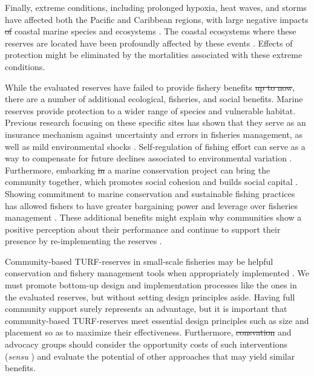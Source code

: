 \documentclass{frontiersSCNS}
\providecommand{\DIFaddtex}[1]{{\protect\color{blue}\uwave{#1}}} %
\providecommand{\DIFdeltex}[1]{{\protect\color{red}\sout{#1}}}                      %
\providecommand{\DIFaddbegin}{} %
\providecommand{\DIFaddend}{} %
\providecommand{\DIFdelbegin}{} %
\providecommand{\DIFdelend}{} %
\providecommand{\DIFadd}[1]{\texorpdfstring{\DIFaddtex{#1}}{#1}} %
\providecommand{\DIFdel}[1]{\texorpdfstring{\DIFdeltex{#1}}{}} %
\begin{document}
Finally, extreme conditions, including prolonged hypoxia, heat waves,
and storms have affected both the Pacific and Caribbean regions, with
large negative impacts \DIFdelbegin \DIFdel{of }\DIFdelend \DIFaddbegin \DIFadd{on }\DIFaddend coastal marine species and ecosystems
\citep{cavole_2016,hughes_2018,breitburg_2018}. The coastal ecosystems
where these reserves are located have been profoundly affected by these
events \citep{micheli_2012-EU,woodson_2018}. Effects of protection might
be eliminated by the mortalities associated with these extreme
conditions.

While the evaluated reserves have failed to provide fishery benefits \DIFdelbegin \DIFdel{up
to
now}\DIFdelend \DIFaddbegin \DIFadd{to
date}\DIFaddend , there are a number of additional ecological, fisheries, and social
benefits. Marine reserves provide protection to a wider range of species
and vulnerable habitat. Previous research focusing on these specific
sites has shown that they serve as an insurance mechanism against
uncertainty and errors in fisheries management, as well as mild
environmental shocks
\citep{micheli_2012-EU,deleo_2015,roberts_2017-J9,aalto}.
Self-regulation of fishing effort can serve as a way to compensate for
future declines associated to environmental variation
\citep{finkbeiner_2018}. Furthermore, embarking \DIFdelbegin \DIFdel{in }\DIFdelend \DIFaddbegin \DIFadd{on }\DIFaddend a marine conservation
project can bring the community together, which promotes social cohesion
and builds social capital \citep{fulton_2019}. Showing commitment to
marine conservation and sustainable fishing practices has allowed
fishers to have greater bargaining power and leverage over fisheries
management \citep{prezramrez_2012}. These additional benefits might
explain why communities show a positive perception about their
performance and continue to support their presence by re-implementing
the reserves \citep{ayer_2018}.

Community-based TURF-reserves in small-scale fisheries may be helpful
conservation and fishery management tools when appropriately implemented
\citep{gelcich_2015}. We must promote bottom-up design and
implementation processes like the ones in the evaluated reserves, but
without setting design principles aside. Having full community support
surely represents an advantage, but it is important that community-based
TURF-reserves meet essential design principles such as size and
placement so as to maximize their effectiveness. Furthermore,
\DIFdelbegin \DIFdel{consvation
}\DIFdelend \DIFaddbegin \DIFadd{conservation }\DIFaddend and advocacy groups should consider the opportunity costs
of such interventions (\emph{sensu} \citet{smith_2010}) and evaluate the
potential of other approaches that may yield similar benefits.
\end{document}
